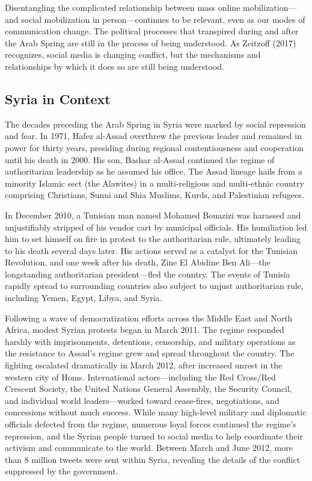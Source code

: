 \documentclass[
  english,
  man]{apa6}
\begin{document}
Disentangling the complicated relationship between mass online mobilization---and
social mobilization in person---continues to be relevant, even as our modes
of communication change. The
political processes that transpired during and after the Arab Spring are still
in the process of being understood. As Zeitzoff (2017) recognizes,
social media is changing conflict, but the mechanisms and relationships by
which it does so are still being understood.

\hypertarget{syria-in-context}{%
\subsection{Syria in Context}\label{syria-in-context}}

The decades preceding the Arab Spring in Syria were marked by
social repression and fear. In 1971, Hafez al-Assad overthrew the previous
leader and remained in power for thirty years, presiding during
regional contentiousness and cooperation until his death in 2000. His son,
Bashar al-Assad continued the regime of authoritarian leadership as he assumed
his office. The Assad lineage hails from a minority Islamic sect (the Alawites)
in a multi-religious and multi-ethnic country comprising Christians, Sunni and
Shia Muslims, Kurds, and Palestinian refugees.

In December 2010, a Tunisian man named Mohamed Bouazizi was harassed and
unjustifiably stripped of his vendor cart by municipal officials. His
humiliation led him to set himself on fire in protest to the authoritarian rule,
ultimately leading to his death several days later. His actions served as a
catalyst for the Tunisian Revolution, and one week after his death, Zine El
Abidine Ben Ali---the longstanding authoritarian president---fled the country.
The events of Tunisia rapidly spread to surrounding countries also subject to
unjust authoritarian rule, including Yemen, Egypt, Libya, and Syria.

Following a wave of democratization efforts across the Middle East and North
Africa, modest Syrian protests began in March 2011. The regime responded
harshly with imprisonments, detentions, censorship, and military operations as
the resistance to Assad's regime grew and spread throughout the country. The
fighting escalated dramatically in March 2012, after increased unrest in the
western city of Homs. International actors---including the Red Cross/Red Crescent
Society, the United Nations General Assembly, the Security Council, and
individual world leaders---worked toward cease-fires, negotiations,
and concessions without much success. While many high-level military and
diplomatic officials defected from the regime, numerous loyal forces
continued the regime's repression, and the Syrian people turned to social
media to help coordinate their activism and communicate to the world. Between March and
June 2012, more than 8 million tweets were sent within Syria, revealing the
details of the conflict suppressed by the government.
\end{document}
